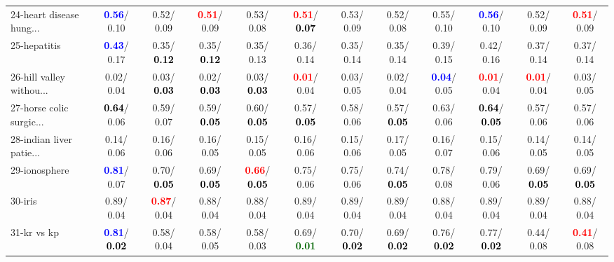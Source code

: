 \begin{table}[h]
\begin{center}
{\begin{tabular}{lc|c|c|c|c|c|c|c|c|c|c}
24-heart disease hung... & \textcolor{blue}{\textbf{  0.56}}/  0.10 &   0.52/  0.09 & \textcolor{red}{\textbf{  0.51}}/  0.09 &   0.53/  0.08 & \textcolor{red}{\textbf{  0.51}}/\textcolor{black}{\textbf{  0.07}} &   0.53/  0.09 &   0.52/  0.08 &   0.55/  0.10 & \textcolor{blue}{\textbf{  0.56}}/  0.10 &   0.52/  0.09 & \textcolor{red}{\textbf{  0.51}}/  0.09 \\
25-hepatitis & \textcolor{blue}{\textbf{  0.43}}/  0.17 &   0.35/\textcolor{black}{\textbf{  0.12}} &   0.35/\textcolor{black}{\textbf{  0.12}} &   0.35/  0.13 &   0.36/  0.14 &   0.35/  0.14 &   0.35/  0.14 &   0.39/  0.15 &   0.42/  0.16 &   0.37/  0.14 &   0.37/  0.14 \\
26-hill valley withou... &   0.02/  0.04 &   0.03/\textcolor{black}{\textbf{  0.03}} &   0.02/\textcolor{black}{\textbf{  0.03}} &   0.03/\textcolor{black}{\textbf{  0.03}} & \textcolor{red}{\textbf{  0.01}}/  0.04 &   0.03/  0.05 &   0.02/  0.04 & \textcolor{blue}{\textbf{  0.04}}/  0.05 & \textcolor{red}{\textbf{  0.01}}/  0.04 & \textcolor{red}{\textbf{  0.01}}/  0.04 &   0.03/  0.05 \\
27-horse colic surgic... & \textcolor{black}{\textbf{  0.64}}/  0.06 &   0.59/  0.07 &   0.59/\textcolor{black}{\textbf{  0.05}} &   0.60/\textcolor{black}{\textbf{  0.05}} &   0.57/\textcolor{black}{\textbf{  0.05}} &   0.58/  0.06 &   0.57/\textcolor{black}{\textbf{  0.05}} &   0.63/  0.06 & \textcolor{black}{\textbf{  0.64}}/\textcolor{black}{\textbf{  0.05}} &   0.57/  0.06 &   0.57/  0.06 \\
28-indian liver patie... &   0.14/  0.06 &   0.16/  0.06 &   0.16/  0.05 &   0.15/  0.05 &   0.16/  0.06 &   0.15/  0.06 &   0.17/  0.05 &   0.16/  0.07 &   0.15/  0.06 &   0.14/  0.05 &   0.14/  0.05 \\ \hline
29-ionosphere & \textcolor{blue}{\textbf{  0.81}}/  0.07 &   0.70/\textcolor{black}{\textbf{  0.05}} &   0.69/\textcolor{black}{\textbf{  0.05}} & \textcolor{red}{\textbf{  0.66}}/\textcolor{black}{\textbf{  0.05}} &   0.75/  0.06 &   0.75/  0.06 &   0.74/\textcolor{black}{\textbf{  0.05}} &   0.78/  0.08 &   0.79/  0.06 &   0.69/\textcolor{black}{\textbf{  0.05}} &   0.69/\textcolor{black}{\textbf{  0.05}} \\
30-iris &   0.89/  0.04 & \textcolor{red}{\textbf{  0.87}}/  0.04 &   0.88/  0.04 &   0.88/  0.04 &   0.89/  0.04 &   0.89/  0.04 &   0.89/  0.04 &   0.88/  0.04 &   0.89/  0.04 &   0.89/  0.04 &   0.88/  0.04 \\
31-kr vs kp & \textcolor{blue}{\textbf{  0.81}}/\textcolor{black}{\textbf{  0.02}} &   0.58/  0.04 &   0.58/  0.05 &   0.58/  0.03 &   0.69/\textcolor{darkgreen}{\textbf{  0.01}} &   0.70/\textcolor{black}{\textbf{  0.02}} &   0.69/\textcolor{black}{\textbf{  0.02}} &   0.76/\textcolor{black}{\textbf{  0.02}} &   0.77/\textcolor{black}{\textbf{  0.02}} &   0.44/  0.08 & \textcolor{red}{\textbf{  0.41}}/  0.08 \\

\end{tabular}}
\end{center}
\end{table}
